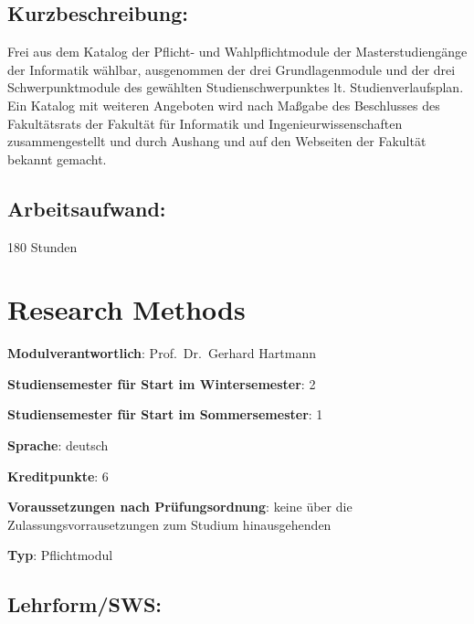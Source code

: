 \section*{Kurzbeschreibung:}\label{kurzbeschreibung-2}

Frei aus dem Katalog der Pflicht- und Wahlpflichtmodule der
Masterstudiengänge der Informatik wählbar, ausgenommen der drei
Grundlagenmodule und der drei Schwerpunktmodule des gewählten
Studienschwerpunktes lt. Studienverlaufsplan. Ein Katalog mit weiteren
Angeboten wird nach Maßgabe des Beschlusses des Fakultätsrats der
Fakultät für Informatik und Ingenieurwissenschaften zusammengestellt und
durch Aushang und auf den Webseiten der Fakultät bekannt gemacht.

\section*{Arbeitsaufwand:}\label{arbeitsaufwand-3}

180 Stunden

\chapter{Research Methods}\label{research-methods}

\begin{modulHead}
\textbf{Modulverantwortlich}: Prof.~Dr.~Gerhard
Hartmann
\end{modulHead}
\begin{modulHead}
\textbf{Studiensemester für
Start im Wintersemester}:
2
\end{modulHead}
\begin{modulHead}
\textbf{Studiensemester für Start
im Sommersemester}:
1
\end{modulHead}
\begin{modulHead}
\textbf{Sprache}:
deutsch
\end{modulHead}
\begin{modulHead}
\textbf{Kreditpunkte}:
6
\end{modulHead}
\begin{modulHead}
\textbf{Voraussetzungen nach
Prüfungsordnung}: keine über die Zulassungsvorrausetzungen zum Studium
hinausgehenden
\end{modulHead}
\begin{modulHead}
\textbf{Typ}:
Pflichtmodul
\end{modulHead}


\section*{Lehrform/SWS:}\label{lehrformsws-3}


